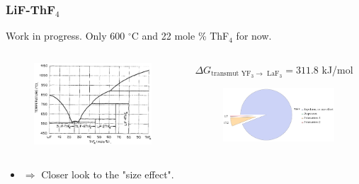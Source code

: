 \documentclass{beamer}
\begin{document}
\begin{frame}
    \frametitle{LiF-ThF$_4$}
    Work in progress. Only 600 $^{\circ}$C and 22 mole \% ThF$_4$ for now.
    \vspace{0.5cm}
    \begin{columns}
        \begin{column}{5cm}
            \begin{figure}
                \includegraphics[width=\textwidth]{LiFThF4ddp.png}
            \end{figure}
        \end{column}
        \begin{column}{7cm}
            $\Delta G_{\text{transmut YF}_3 \rightarrow\text{ LaF}_3} = 311.8$ kJ/mol
            \begin{figure}
                \includegraphics[width=\textwidth]{LiFThF4piechart.png}
            \end{figure}
        \end{column}
    \end{columns}
    \begin{itemize}
        \item $\Rightarrow$ Closer look to the "size effect".
    \end{itemize}
\end{frame}
\end{document}
